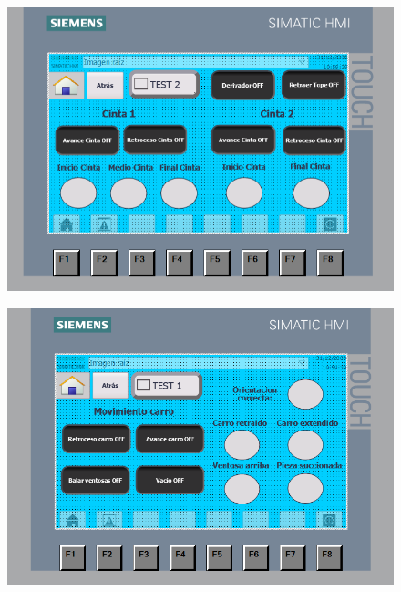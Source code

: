 \begin{figure}[H]
  \centering

  \begin{minipage}{0.74\textwidth}
    \centering
    \includegraphics[width=\textwidth]{figs/HMI_test_union_1}
    \label{fig:HMI_test_union_1}
  \end{minipage}
  \hfill
  \begin{minipage}{0.74\textwidth}
    \centering
    \includegraphics[width=\textwidth]{figs/HMI_test_union_2}
    \label{fig:HMI_test_union_2}
  \end{minipage}
\end{figure}


